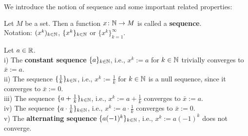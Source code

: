 \begin{frame}
We introduce the notion of sequence and some important related properties: \vspace{-0.2cm}
\begin{defi}[Sequence]\label{def:sequence}
 Let $M$ be a set. Then a function $x\colon {\mathbb{N}} \to M$ is called a \textbf{sequence}.\\ Notation: $(x^k)_{k\in {\mathbb{N}}}$, $\{x^k\}_{k\in {\mathbb{N}}}$ or $\{x^k\}_{k=1}^\infty$.
\end{defi}
\vspace{0.3cm}
\begin{ex} \blank 
	Let $a \in {\mathbb{R}}$.\\
	i)  The \textbf{constant sequence} $\{a\}_{k\in{\mathbb{N}}}$, i.e., $x^k := a$ for $k\in {\mathbb{N}}$ trivially converges to $\bar{x} := a$. \\
	ii) The sequence $\{\frac{1}{k}\}_{k\in{\mathbb{N}}}$, i.e.,  $x^k := \frac{1}{k}$ for $k\in {\mathbb{N}}$ is a null sequence, since it converges to $\bar{x} := 0$.\\
	iii) The sequence $\{a + \frac{1}{k}\}_{k\in{\mathbb{N}}}$, i.e.,  $x^k := a + \frac{1}{k}$ converges to $\bar{x} := a$.\\
	iv) The sequence $\{a \cdot\frac{1}{k}\}_{k\in{\mathbb{N}}}$, i.e.,  $x^k := a \cdot \frac{1}{k}$ converges to $\bar{x} := 0$.\\
	v) The \textbf{alternating sequence} $\{a (-1)^k\}_{k\in{\mathbb{N}}}$, i.e.,  $x^k := a (-1)^k$ does not converge.
\end{ex}
\end{frame}

